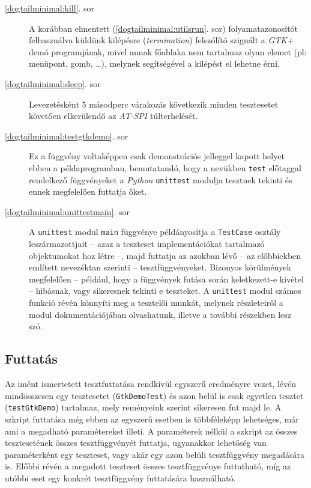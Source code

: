 \begin{description}
 \item[\ref{dogtailminimal:kill}. sor] A korábban elmentett (\ref{dogtailminimal:utilsrun}. sor) folyamatazonosítót felhasználva küldünk kilépésre (\textit{termination}) felszólító szignált a \textit{GTK+} demó programjának, mivel annak főablaka nem tartalmaz olyan elemet (pl: menüpont, gomb, \dots), melynek segítségével a kilépést el lehetne érni.

 \item[\ref{dogtailminimal:sleep}. sor] Levezetésként 5 másodperc várakozás következik minden tesztesetet követően elkerülendő az \textit{AT-SPI} túlterhelését.

 \item[\ref{dogtailminimal:testgtkdemo}. sor] Ez a függvény voltaképpen csak demonstrációs jelleggel kapott helyet ebben a példaprogramban, bemutatandó, hogy a nevükben \texttt{test} előtaggal rendelkező függvényeket a \textit{Python} \texttt{unittest} modulja tesztnek tekinti és ennek megfelelően futtatja őket.

 \item[\ref{dogtailminimal:unittestmain}. sor] A \texttt{unittest} modul \texttt{main} függvénye példányosítja a \texttt{TestCase} osztály leszármazottjait -- azaz a teszteset implementációkat tartalmazó objektumokat hoz létre --, majd futtatja az azokban lévő -- az előbbiekben említett nevezéktan szerinti -- tesztfüggvényeket. Bizonyos körülmények megfelelően -- például, hogy a függvények futása során keletkezett-e kivétel -- hibásnak, vagy sikeresnek tekinti e teszteket. A \texttt{unittest} modul számos funkció révén könnyíti meg a tesztelői munkát, melynek részleteiről a modul dokumentációjában olvashatunk, illetve a további részekben lesz szó.

\end{description}

\subsection{Futtatás}

Az imént ismertetett tesztfuttatása rendkívül egyszerű eredményre vezet, lévén mindösszesen egy tesztesetet (\texttt{GtkDemoTest}) és azon belül is csak egyetlen tesztet (\texttt{testGtkDemo}) tartalmaz, mely reményeink szerint sikeresen fut majd le. A szkript futtatása még ebben az egyszerű esetben is többféleképp lehetséges, már ami a megadható paramétereket illeti. A paraméterek nélkül a szkript az összes tesztesetének összes tesztfüggvényét futtatja, ugyanakkor lehetőség van paraméterként egy teszteset, vagy akár egy azon belüli tesztfüggvény megadására is. Előbbi révén a megadott teszteset összes tesztfüggvénye futtatható, míg az utóbbi eset egy konkrét tesztfüggvény futtatására használható.


